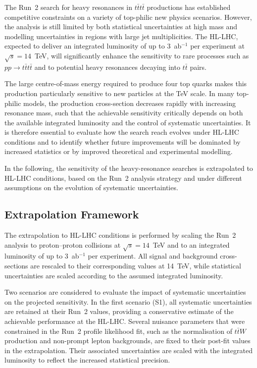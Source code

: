 ﻿The Run~2 search for heavy resonances in $t\bar{t}t\bar{t}$ productions has established competitive constraints on a variety of top-philic new physics scenarios. 
However, the analysis is still limited by both statistical uncertainties at high mass and modelling uncertainties in regions with large jet multiplicities. 
The HL-LHC, expected to deliver an integrated luminosity of up to 3~ab$^{-1}$ per experiment at $\sqrt{s}=14$~TeV, will significantly enhance the sensitivity to rare processes such as $pp \to t\bar{t}t\bar{t}$ and to potential heavy resonances decaying into $t\bar{t}$ pairs.

The large centre-of-mass energy required to produce four top quarks makes this production particularly sensitive to new particles at the TeV scale. 
In many top-philic models, the production cross-section decreases rapidly with increasing resonance mass, such that the achievable sensitivity critically depends on both the available integrated luminosity and the control of systematic uncertainties. 
It is therefore essential to evaluate how the search reach evolves under HL-LHC conditions and to identify whether future improvements will be dominated by increased statistics or by improved theoretical and experimental modelling.

In the following, the sensitivity of the heavy-resonance searches is extrapolated to HL-LHC conditions, based on the Run~2 analysis strategy and under different assumptions on the evolution of systematic uncertainties.

\subsection{Extrapolation Framework}
\label{sec:HL_framework}

The extrapolation to HL-LHC conditions is performed by scaling the Run~2 analysis to proton--proton collisions at $\sqrt{s}=14$~TeV and to an integrated luminosity of up to 3~ab$^{-1}$ per experiment. 
All signal and background cross-sections are rescaled to their corresponding values at 14~TeV, while statistical uncertainties are scaled according to the assumed integrated luminosity.

Two scenarios are considered to evaluate the impact of systematic uncertainties on the projected sensitivity. 
In the first scenario (S1), all systematic uncertainties are retained at their Run~2 values, providing a conservative estimate of the achievable performance at the HL-LHC. 
Several nuisance parameters that were constrained in the Run~2 profile likelihood fit, such as the normalisation of $t\bar{t}W$ production and non-prompt lepton backgrounds, are fixed to their post-fit values in the extrapolation. 
Their associated uncertainties are scaled with the integrated luminosity to reflect the increased statistical precision.


